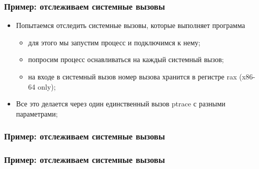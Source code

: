 \begin{frame}
\frametitle{Пример: отслеживаем системные вызовы}

\begin{itemize}
  \item Попытаемся отследить системные вызовы, которые выполняет программа
    \begin{itemize}
      \item для этого мы запустим процесс и подключимся к нему;
      \item попросим процесс оснавливаться на каждый системный вызов;
      \item на входе в системный вызов номер вызова хранится в регистре rax (x86-64 only);
    \end{itemize}
  \item Все это делается через один единственный вызов ptrace с разными параметрами;
\end{itemize}
\end{frame}

\begin{frame}[fragile]
\frametitle{Пример: отслеживаем системные вызовы}

\end{frame}

\begin{frame}[fragile]
\frametitle{Пример: отслеживаем системные вызовы}

\end{frame}


